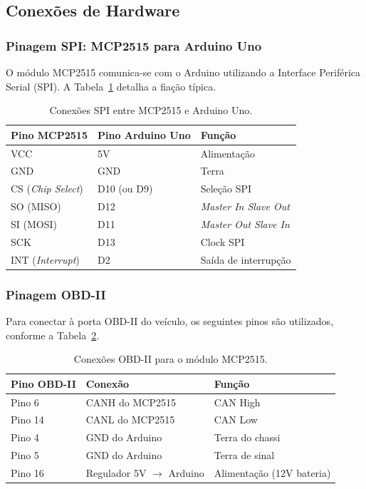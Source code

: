 \subsection{Conexões de Hardware}

\subsubsection{Pinagem SPI: MCP2515 para Arduino Uno}

O módulo MCP2515 comunica-se com o Arduino utilizando a Interface Periférica Serial (SPI). A Tabela~\ref{tab:pinagem-spi} detalha a fiação típica.

\begin{table}[H]
\centering
\caption{Conexões SPI entre MCP2515 e Arduino Uno.}
\label{tab:pinagem-spi}
\begin{tabular}{@{}lll@{}}
\toprule
\textbf{Pino MCP2515} & \textbf{Pino Arduino Uno} & \textbf{Função} \\
\midrule
VCC & 5V & Alimentação \\
GND & GND & Terra \\
CS (\textit{Chip Select}) & D10 (ou D9) & Seleção SPI \\
SO (MISO) & D12 & \textit{Master In Slave Out} \\
SI (MOSI) & D11 & \textit{Master Out Slave In} \\
SCK & D13 & Clock SPI \\
INT (\textit{Interrupt}) & D2 & Saída de interrupção \\
\bottomrule
\end{tabular}
\end{table}

\subsubsection{Pinagem OBD-II}

Para conectar à porta OBD-II do veículo, os seguintes pinos são utilizados, conforme a Tabela~\ref{tab:pinagem-obd}.

\begin{table}[H]
\centering
\caption{Conexões OBD-II para o módulo MCP2515.}
\label{tab:pinagem-obd}
\begin{tabular}{@{}lll@{}}
\toprule
\textbf{Pino OBD-II} & \textbf{Conexão} & \textbf{Função} \\
\midrule
Pino 6 & CANH do MCP2515 & CAN High \\
Pino 14 & CANL do MCP2515 & CAN Low \\
Pino 4 & GND do Arduino & Terra do chassi \\
Pino 5 & GND do Arduino & Terra de sinal \\
Pino 16 & Regulador 5V $\rightarrow$ Arduino & Alimentação (12V bateria) \\
\bottomrule
\end{tabular}
\end{table}

